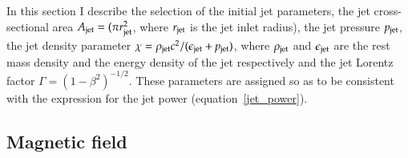 In this section I describe the selection of the initial jet parameters, the jet cross-sectional area $A_{\rm jet} = (\pi r_{\rm jet}^2$, where $r_{\rm jet}$ is the jet inlet radius), the jet pressure $p_{\rm jet}$, the jet density parameter $\chi = \rho_{\rm jet} c^2 / (\epsilon_{\rm jet} + p_{\rm jet})$, where $\rho_{\rm jet}$ and $\epsilon_{\rm jet}$ are the rest mass density and the energy density of the jet respectively and the jet Lorentz factor $\Gamma = (1- \beta^2)^{-1/2}$.  These parameters are assigned so as to be consistent with the expression for the jet power (equation~\ref{jet_power}).


\subsection{Magnetic field}\label{s:mag}	


